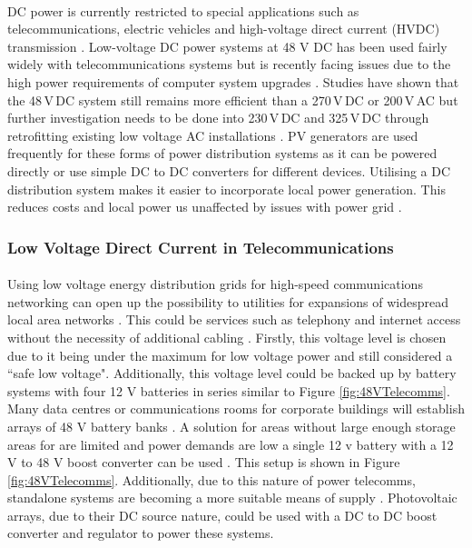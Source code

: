 \paragraph{}
DC power is currently restricted to special applications such as telecommunications, electric vehicles and high-voltage direct current (HVDC) transmission \cite{Salomonsson2007}. Low-voltage DC power systems at 48 V DC has been used fairly widely with telecommunications systems but is recently facing issues due to the high power requirements of computer system upgrades \cite{Salomonsson2007}. Studies have shown that the 48\,V\,DC system still remains more efficient than a 270\,V\,DC or 200\,V\,AC but further investigation needs to be done into 230\,V\,DC and 325\,V\,DC through retrofitting existing low voltage AC installations \cite{Salomonsson2007}. PV generators are used frequently for these forms of power distribution systems as it can be powered directly or use simple DC to DC converters for different devices. Utilising a DC distribution system makes it easier to incorporate local power generation. This reduces costs and local power us unaffected by issues with power grid \cite{Starke2008a}. 

\subsubsection{Low Voltage Direct Current in Telecommunications}

\paragraph{}
Using low voltage energy distribution grids for high-speed communications networking can open up the possibility to utilities for expansions of widespread local area networks \cite{Waldeck1998}. This could be services such as telephony and internet access without the necessity of additional cabling \cite{Waldeck1998}. Firstly, this voltage level is chosen due to it being under the maximum for low voltage power and still considered a ``safe low voltage". Additionally, this voltage level could be backed up by battery systems with four 12 \si{V} batteries in series similar to Figure \ref{fig:48VTelecomms}. Many data centres or communications rooms for corporate buildings will establish arrays of 48 \si{V} battery banks \cite{website:48VTelecomms}. A solution for areas without large enough storage areas for are limited and power demands are low a single 12 \si{v} battery with a 12 \si{V} to 48 \si{V} boost converter can be used \cite{website:48VTelecomms}. This setup is shown in Figure \ref{fig:48VTelecomms}. Additionally, due to this nature of power telecomms, standalone systems are becoming a more suitable means of supply \cite{Ribeiro2009}. Photovoltaic arrays, due to their DC source nature, could be used with a DC to DC boost converter and regulator to power these systems.   

